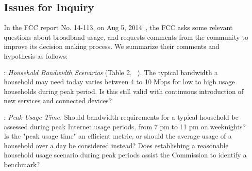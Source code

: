 \subsection{Issues for Inquiry}
\label{sec:hypothesis}

In the FCC report No. 14-113, on Aug 5, 2014~\cite{fcc2015progress-report}, the FCC asks some relevant questions about broadband usage, and requests comments from the community to improve its decision making process. We summarize their comments and hypothesis as follows:

: \emph{Household Bandwidth Scenarios} (Table 2, ~\cite{fcc2015progress-report}). The typical bandwidth a household may need today varies between 4 to 10 Mbps for low to high usage households during peak period. Is this still valid with continuous introduction of new services and connected devices?


: \emph{Peak Usage Time.} Should bandwidth requirements for a typical household be assessed during peak Internet usage periods, from 7 pm to 11 pm on weeknights? Is the "peak usage time" an efficient metric, or should the average usage of a household over a day be considered instead? Does establishing a reasonable household usage scenario during peak periods assist the Commission to identify a benchmark?



